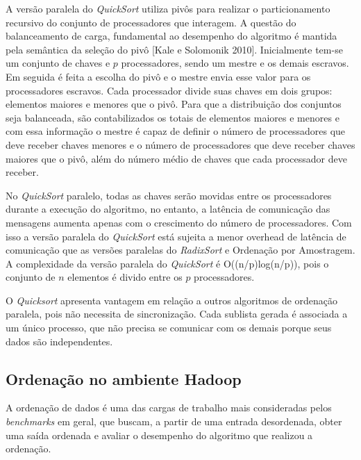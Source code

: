 A versão paralela do \textit{QuickSort} utiliza pivôs para realizar o particionamento recursivo do conjunto de processadores que interagem. A questão do balanceamento de carga, fundamental ao desempenho do algoritmo é mantida pela semântica da seleção do pivô [Kale e Solomonik 2010]. Inicialmente tem-se um conjunto de chaves e $p$ processadores, sendo um mestre e os demais escravos. Em seguida é feita a escolha do pivô e o mestre envia esse valor para os processadores escravos. Cada processador divide suas chaves em dois grupos: elementos maiores e menores que o pivô. 
Para que  a distribuição dos conjuntos seja balanceada, são contabilizados os totais de elementos maiores e menores e com essa informação o mestre é capaz de definir o número de processadores que deve receber chaves menores e o número de processadores que deve receber chaves maiores que o pivô, além do número médio de chaves que cada processador deve receber. 

No \textit{QuickSort} paralelo, todas as chaves serão movidas entre os processadores durante a execução do algoritmo, no entanto, a latência de comunicação das mensagens aumenta apenas com o crescimento do número de processadores. Com isso a versão paralela do \textit{QuickSort} está sujeita a menor overhead de latência de comunicação que as versões paralelas do \textit{RadixSort} e Ordenação por Amostragem. A complexidade da versão paralela do \textit{QuickSort} é O((n/p)log(n/p)), pois o conjunto de $n$ elementos é divido entre os $p$ processadores.  

 
O \textit{Quicksort} apresenta vantagem em relação a outros algoritmos de ordenação paralela, pois 
não necessita de sincronização. Cada sublista gerada é associada a um único processo, que não precisa se comunicar com os demais porque seus dados são independentes. 


	
 \subsection{Ordenação no ambiente Hadoop}
\label{sec:benchmarks}
A ordenação de dados é uma das cargas de trabalho mais consideradas pelos \textit{benchmarks} em geral, que buscam, a partir de uma entrada desordenada, obter uma saída ordenada e avaliar o desempenho do algoritmo que realizou a ordenação.

